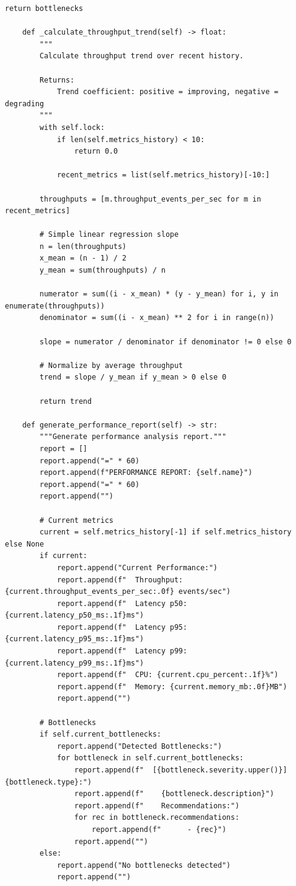 \begin{lstlisting}[style=python, caption={Performance Monitor with Bottleneck Detection}]
        return bottlenecks

    def _calculate_throughput_trend(self) -> float:
        """
        Calculate throughput trend over recent history.

        Returns:
            Trend coefficient: positive = improving, negative = degrading
        """
        with self.lock:
            if len(self.metrics_history) < 10:
                return 0.0

            recent_metrics = list(self.metrics_history)[-10:]

        throughputs = [m.throughput_events_per_sec for m in recent_metrics]

        # Simple linear regression slope
        n = len(throughputs)
        x_mean = (n - 1) / 2
        y_mean = sum(throughputs) / n

        numerator = sum((i - x_mean) * (y - y_mean) for i, y in enumerate(throughputs))
        denominator = sum((i - x_mean) ** 2 for i in range(n))

        slope = numerator / denominator if denominator != 0 else 0

        # Normalize by average throughput
        trend = slope / y_mean if y_mean > 0 else 0

        return trend

    def generate_performance_report(self) -> str:
        """Generate performance analysis report."""
        report = []
        report.append("=" * 60)
        report.append(f"PERFORMANCE REPORT: {self.name}")
        report.append("=" * 60)
        report.append("")

        # Current metrics
        current = self.metrics_history[-1] if self.metrics_history else None
        if current:
            report.append("Current Performance:")
            report.append(f"  Throughput: {current.throughput_events_per_sec:.0f} events/sec")
            report.append(f"  Latency p50: {current.latency_p50_ms:.1f}ms")
            report.append(f"  Latency p95: {current.latency_p95_ms:.1f}ms")
            report.append(f"  Latency p99: {current.latency_p99_ms:.1f}ms")
            report.append(f"  CPU: {current.cpu_percent:.1f}%")
            report.append(f"  Memory: {current.memory_mb:.0f}MB")
            report.append("")

        # Bottlenecks
        if self.current_bottlenecks:
            report.append("Detected Bottlenecks:")
            for bottleneck in self.current_bottlenecks:
                report.append(f"  [{bottleneck.severity.upper()}] {bottleneck.type}:")
                report.append(f"    {bottleneck.description}")
                report.append(f"    Recommendations:")
                for rec in bottleneck.recommendations:
                    report.append(f"      - {rec}")
                report.append("")
        else:
            report.append("No bottlenecks detected")
            report.append("")


\end{lstlisting}
